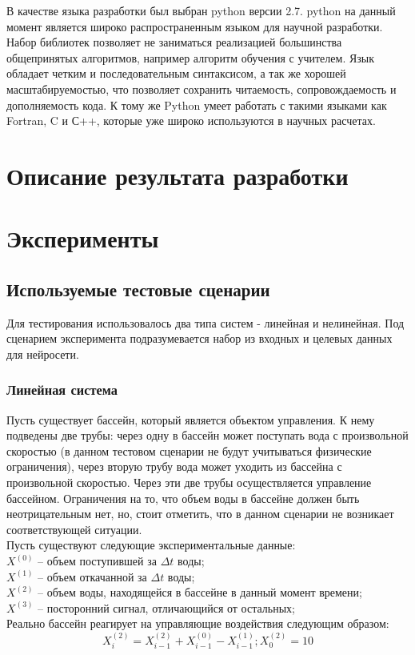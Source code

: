\documentclass[utf8,usehyperref,12pt]{G7-32}
\begin{document}
В качестве языка разработки был выбран python версии 2.7. python на данный момент является широко распространенным языком для научной разработки. Набор библиотек позволяет не заниматься реализацией большинства общепринятых алгоритмов, например алгоритм обучения с учителем. Язык обладает четким и последовательным синтаксисом, а так же хорошей масштабируемостью, что позволяет сохранить читаемость, сопровождаемость и дополняемость кода. К тому же Python умеет работать с такими языками как Fortran, C и С++, которые уже широко используются в научных расчетах.

\chapter{Описание результата разработки}
\chapter{Эксперименты}
\section{Используемые тестовые сценарии}
Для тестирования использовалось два типа систем - линейная и нелинейная. Под сценарием эксперимента подразумевается набор из входных и целевых данных для нейросети.
\subsection{Линейная система}
Пусть существует бассейн, который является объектом управления. К нему подведены две трубы: через одну в бассейн может поступать вода с произвольной скоростью (в данном тестовом сценарии не будут учитываться физические ограничения), через вторую трубу вода может уходить из бассейна с произвольной скоростью. Через эти две трубы осуществляется управление бассейном. Ограничения на то, что объем воды в бассейне должен быть неотрицательным нет, но, стоит отметить, что в данном сценарии не возникает соответствующей ситуации.\\
Пусть существуют следующие экспериментальные данные:\\
$ X^{(0)} $ – объем поступившей за $ \Delta t $ воды;\\
$ X^{(1)} $ – объем откачанной за $ \Delta t $ воды;\\
$ X^{(2)} $ – объем воды, находящейся в бассейне в данный момент времени;\\
$ X^{(3)} $ – посторонний сигнал, отличающийся от остальных;\\
Реально бассейн реагирует на управляющие воздействия следующим образом:\\
\begin{equation}
X^{(2)}_{i} = X^{(2)}_{i-1} + X^{(0)}_{i-1} - X^{(1)}_{i-1}; X^{(2)}_{0}=10
\end{equation}
\end{document}
